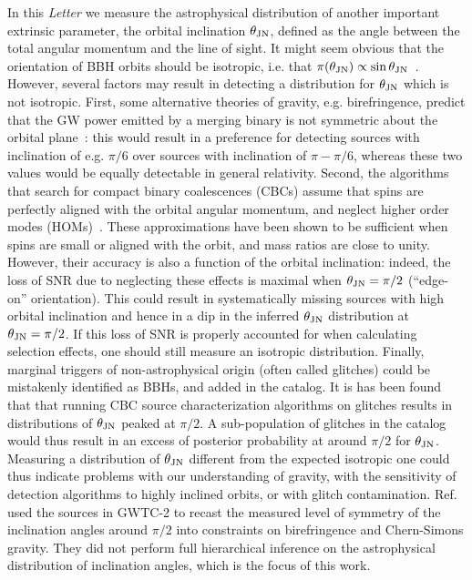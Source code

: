 \documentclass[floats,floatfix,showpacs,amssymb,prl,twocolumn,superscriptaddress,nofootinbib]{revtex4-2}
\newcommand{\paper}{{\it Letter}\xspace}
\newcommand{\tjn}{\ensuremath{\theta_{\rm{JN}}}\xspace}
\begin{document}
In this \paper we measure the astrophysical distribution of another important extrinsic parameter, the orbital inclination \tjn, defined as the angle between the total angular momentum and the line of sight. It might seem obvious that the orientation of BBH orbits should be isotropic, i.e. that $\pi(\tjn) \propto \sin\tjn$~\cite{Maggiore:2007ulw,Schutz:2011tw}. However, several factors may result in detecting a distribution for \tjn which is not isotropic. First, some alternative theories of gravity, e.g. birefringence, predict that the GW power emitted by a merging binary is not symmetric about the orbital plane~\cite{Alexander:2009tp,Zhao:2019xmm,Okounkova:2021xjv}: this would result in a preference for detecting sources with inclination of e.g. $\pi/6$ over sources with inclination of $\pi - \pi/6$, whereas these two values would be equally detectable in general relativity. 
Second, the algorithms that search for compact binary coalescences (CBCs) assume that spins are perfectly aligned with the orbital angular momentum, {and neglect higher order modes (HOMs)}~\cite{LIGOScientific:2021djp}. These approximations have been shown to be sufficient when spins are small or aligned with the orbit, and mass ratios are close to unity. However, their accuracy is also a function of the orbital inclination: indeed, the loss of SNR due to neglecting these effects is maximal when $\tjn = \pi/2$ (``edge-on'' orientation). This could result in systematically missing sources with high orbital inclination and hence in a dip in the inferred \tjn distribution at $\tjn = \pi/2$. If this loss of SNR is properly accounted for when calculating selection effects, one should still measure an isotropic distribution. 
Finally, marginal triggers of non-astrophysical origin (often called glitches) could be mistakenly identified as BBHs, and added in the catalog. It is has been found that that running CBC source characterization algorithms on glitches results in distributions of \tjn peaked at $\pi/2$.
A sub-population of glitches in the catalog would thus result in an excess of posterior probability at around $\pi/2$ for \tjn.
Measuring a distribution of \tjn different from the expected isotropic one could thus indicate problems with our understanding of gravity, with the sensitivity of detection algorithms to highly inclined orbits, or with glitch contamination. Ref.~\cite{Okounkova:2021xjv}  used the sources in GWTC-2 to recast the measured level of symmetry of the inclination angles around $\pi/2$ into constraints on birefringence and Chern-Simons gravity. They did not perform full hierarchical inference on the astrophysical distribution of inclination angles, which is the focus of this work.
\end{document}
